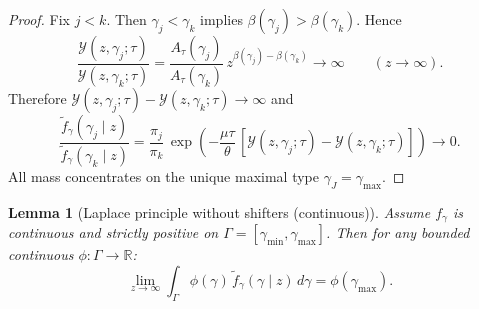 \documentclass[12pt,a4paper]{article}
\theoremstyle{definition}
\theoremstyle{plain}
\newtheorem{lemma}{Lemma}[section]
\theoremstyle{remark}
\newcommand{\R}{\mathbb{R}}
\newcommand{\calY}{\mathcal{Y}}
\begin{document}
\begin{proof}
Fix $j < k$.  Then $\gamma_j < \gamma_k$ implies $\beta(\gamma_j) > \beta(\gamma_k)$.  Hence
\[
  \frac{\calY(z,\gamma_j;\tau)}{\calY(z,\gamma_k;\tau)} = \frac{A_{\tau}(\gamma_j)}{A_{\tau}(\gamma_k)}\,z^{\beta(\gamma_j)-\beta(\gamma_k)} \to \infty \qquad (z \to \infty).
\]
Therefore $\calY(z,\gamma_j;\tau) - \calY(z,\gamma_k;\tau) \to \infty$ and
\[
  \frac{\widetilde{f}_{\gamma}(\gamma_j \mid z)}{\widetilde{f}_{\gamma}(\gamma_k \mid z)} = \frac{\pi_j}{\pi_k}\,\exp\!\left(-\frac{\mu\tau}{\theta}\,[\calY(z,\gamma_j;\tau) - \calY(z,\gamma_k;\tau)]\right) \to 0.
\]
All mass concentrates on the unique maximal type $\gamma_J = \gamma_{\max}$.
\end{proof}

\begin{lemma}[Laplace principle without shifters (continuous)]
\label{lem:laplace_no_shifter_2D}
Assume $f_{\gamma}$ is continuous and strictly positive on $\Gamma = [\gamma_{\min},\gamma_{\max}]$.  Then for any bounded continuous $\phi: \Gamma \to \R$:
\[
  \lim_{z \to \infty}\int_{\Gamma}\phi(\gamma)\,\widetilde{f}_{\gamma}(\gamma \mid z)\,d\gamma = \phi(\gamma_{\max}).
\]
\end{lemma}
\end{document}
